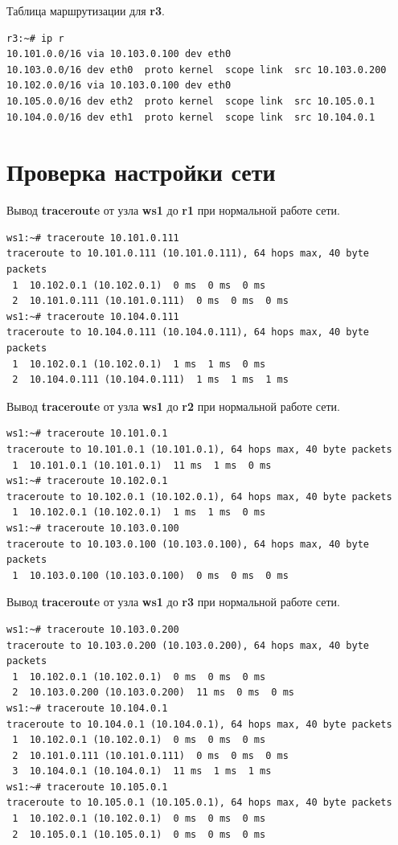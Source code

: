 \documentclass[a4paper,12pt]{article}
\begin{document}
Таблица маршрутизации для \textbf{r3}.

\begin{Verbatim}
r3:~# ip r
10.101.0.0/16 via 10.103.0.100 dev eth0 
10.103.0.0/16 dev eth0  proto kernel  scope link  src 10.103.0.200 
10.102.0.0/16 via 10.103.0.100 dev eth0 
10.105.0.0/16 dev eth2  proto kernel  scope link  src 10.105.0.1 
10.104.0.0/16 dev eth1  proto kernel  scope link  src 10.104.0.1
\end{Verbatim}


\section{Проверка настройки сети}

Вывод \textbf{traceroute} от узла \textbf{ws1} до \textbf{r1} при нормальной работе сети.

\begin{Verbatim}
ws1:~# traceroute 10.101.0.111
traceroute to 10.101.0.111 (10.101.0.111), 64 hops max, 40 byte packets
 1  10.102.0.1 (10.102.0.1)  0 ms  0 ms  0 ms
 2  10.101.0.111 (10.101.0.111)  0 ms  0 ms  0 ms
ws1:~# traceroute 10.104.0.111
traceroute to 10.104.0.111 (10.104.0.111), 64 hops max, 40 byte packets
 1  10.102.0.1 (10.102.0.1)  1 ms  1 ms  0 ms
 2  10.104.0.111 (10.104.0.111)  1 ms  1 ms  1 ms
\end{Verbatim}

Вывод \textbf{traceroute} от узла \textbf{ws1} до \textbf{r2} при нормальной работе сети.

\begin{Verbatim}
ws1:~# traceroute 10.101.0.1
traceroute to 10.101.0.1 (10.101.0.1), 64 hops max, 40 byte packets
 1  10.101.0.1 (10.101.0.1)  11 ms  1 ms  0 ms
ws1:~# traceroute 10.102.0.1
traceroute to 10.102.0.1 (10.102.0.1), 64 hops max, 40 byte packets
 1  10.102.0.1 (10.102.0.1)  1 ms  1 ms  0 ms
ws1:~# traceroute 10.103.0.100
traceroute to 10.103.0.100 (10.103.0.100), 64 hops max, 40 byte packets
 1  10.103.0.100 (10.103.0.100)  0 ms  0 ms  0 ms
\end{Verbatim}

Вывод \textbf{traceroute} от узла \textbf{ws1} до \textbf{r3} при нормальной работе сети.

\begin{Verbatim}
ws1:~# traceroute 10.103.0.200
traceroute to 10.103.0.200 (10.103.0.200), 64 hops max, 40 byte packets
 1  10.102.0.1 (10.102.0.1)  0 ms  0 ms  0 ms
 2  10.103.0.200 (10.103.0.200)  11 ms  0 ms  0 ms
ws1:~# traceroute 10.104.0.1
traceroute to 10.104.0.1 (10.104.0.1), 64 hops max, 40 byte packets
 1  10.102.0.1 (10.102.0.1)  0 ms  0 ms  0 ms
 2  10.101.0.111 (10.101.0.111)  0 ms  0 ms  0 ms
 3  10.104.0.1 (10.104.0.1)  11 ms  1 ms  1 ms
ws1:~# traceroute 10.105.0.1
traceroute to 10.105.0.1 (10.105.0.1), 64 hops max, 40 byte packets
 1  10.102.0.1 (10.102.0.1)  0 ms  0 ms  0 ms
 2  10.105.0.1 (10.105.0.1)  0 ms  0 ms  0 ms
\end{Verbatim}
\end{document}
